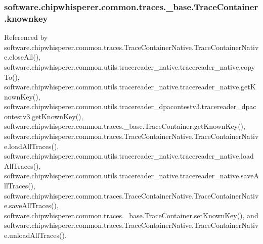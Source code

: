 \hypertarget{classsoftware_1_1chipwhisperer_1_1common_1_1traces_1_1__base_1_1TraceContainer_aff5b1978e8681de9c0c876ca47621e3c}{}
\subsubsection[{knownkey}]{\setlength{\rightskip}{0pt plus 5cm}software.\+chipwhisperer.\+common.\+traces.\+\_\+base.\+Trace\+Container.\+knownkey}\label{classsoftware_1_1chipwhisperer_1_1common_1_1traces_1_1__base_1_1TraceContainer_aff5b1978e8681de9c0c876ca47621e3c}


Referenced by software.\+chipwhisperer.\+common.\+traces.\+Trace\+Container\+Native.\+Trace\+Container\+Native.\+close\+All(), software.\+chipwhisperer.\+common.\+utils.\+tracereader\+\_\+native.\+tracereader\+\_\+native.\+copy\+To(), software.\+chipwhisperer.\+common.\+utils.\+tracereader\+\_\+native.\+tracereader\+\_\+native.\+get\+Known\+Key(), software.\+chipwhisperer.\+common.\+utils.\+tracereader\+\_\+dpacontestv3.\+tracereader\+\_\+dpacontestv3.\+get\+Known\+Key(), software.\+chipwhisperer.\+common.\+traces.\+\_\+base.\+Trace\+Container.\+get\+Known\+Key(), software.\+chipwhisperer.\+common.\+traces.\+Trace\+Container\+Native.\+Trace\+Container\+Native.\+load\+All\+Traces(), software.\+chipwhisperer.\+common.\+utils.\+tracereader\+\_\+native.\+tracereader\+\_\+native.\+load\+All\+Traces(), software.\+chipwhisperer.\+common.\+utils.\+tracereader\+\_\+native.\+tracereader\+\_\+native.\+save\+All\+Traces(), software.\+chipwhisperer.\+common.\+traces.\+Trace\+Container\+Native.\+Trace\+Container\+Native.\+save\+All\+Traces(), software.\+chipwhisperer.\+common.\+traces.\+\_\+base.\+Trace\+Container.\+set\+Known\+Key(), and software.\+chipwhisperer.\+common.\+traces.\+Trace\+Container\+Native.\+Trace\+Container\+Native.\+unload\+All\+Traces().

\hypertarget{classsoftware_1_1chipwhisperer_1_1common_1_1traces_1_1__base_1_1TraceContainer_a6385d276065704b43e1d7867098a235c}{}
